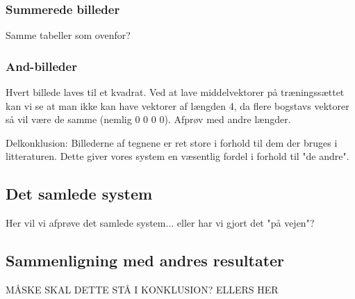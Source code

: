 \subsubsection{Summerede billeder}
Samme tabeller som ovenfor?

\subsubsection{And-billeder}
Hvert billede laves til et kvadrat. Ved at lave middelvektorer på træningssættet kan vi se at man ikke kan have vektorer af længden 4, da flere bogstavs vektorer så vil være de samme (nemlig 0 0 0 0). Afprøv med andre længder.



Delkonklusion:
Billederne af tegnene er ret store i forhold til dem der bruges i litteraturen. Dette giver vores system en væsentlig fordel i forhold til "de andre".

\subsection{Det samlede system}

Her vil vi afprøve det samlede system... eller har vi gjort det "på vejen"?

\subsection{Sammenligning med andres resultater}

MÅSKE SKAL DETTE STÅ I KONKLUSION? ELLERS HER
